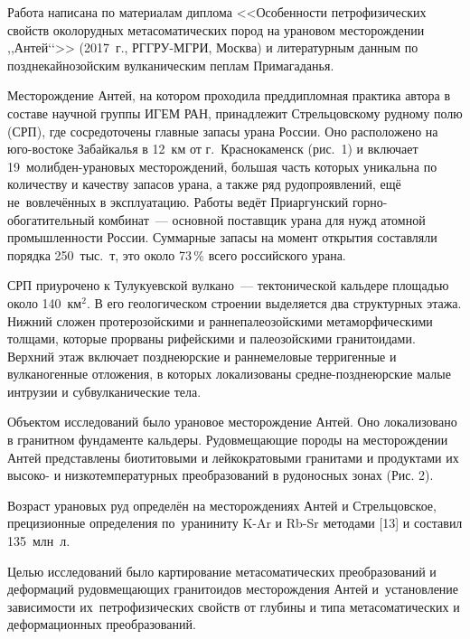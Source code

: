  

\makeProcTitle
{}

Работа написана по материалам диплома <<Особенности петрофизических свойств околорудных метасоматических пород на урановом месторождении ,,Антей‘‘>> (2017~г., РГГРУ-МГРИ, Москва) и литературным данным по позднекайнозойским вулканическим пеплам Примагаданья.



Месторождение Антей, на котором проходила преддипломная практика автора в составе научной группы ИГЕМ РАН, принадлежит Стрельцовскому рудному полю (СРП), где сосредоточены главные запасы урана России. Оно расположено на юго-востоке Забайкалья в 12~км от г.~Краснокаменск (рис.~1) и включает 19~молибден-урановых месторождений, большая часть которых уникальна по количеству и качеству запасов урана, а также ряд рудопроявлений, ещё не~вовлечённых в эксплуатацию. Работы ведёт Приаргунский горно-обогатительный комбинат~--- основной поставщик урана для нужд атомной промышленности России. Суммарные запасы на момент открытия составляли порядка 250~тыс.~т, это около 73\,\% всего российского урана.

СРП приурочено к Тулукуевской вулкано~--- тектонической кальдере площадью около 140~км$^2$. В его геологическом строении выделяется два структурных этажа. Нижний сложен протерозойскими и раннепалеозойскими метаморфическими толщами, которые прорваны рифейскими и палеозойскими гранитоидами. Верхний этаж включает позднеюрские и раннемеловые терригенные и вулканогенные отложения, в которых локализованы средне-позднеюрские малые интрузии и субвулканические тела.

Объектом исследований было урановое месторождение Антей. Оно локализовано в гранитном фундаменте кальдеры. Рудовмещающие породы на месторождении Антей представлены биотитовыми и лейкократовыми гранитами и продуктами их высоко- и низкотемпературных преобразований в рудоносных зонах (Рис. 2).

Возраст урановых руд определён на месторождениях Антей и Стрельцовское, прецизионные определения по~ураниниту K-Ar и Rb-Sr методами [13] и составил 135~млн~л.



Целью исследований было картирование метасоматических преобразований и деформаций рудовмещающих гранитоидов месторождения Антей и~установление зависимости их~петрофизических свойств от глубины и типа метасоматических и деформационных преобразований.

